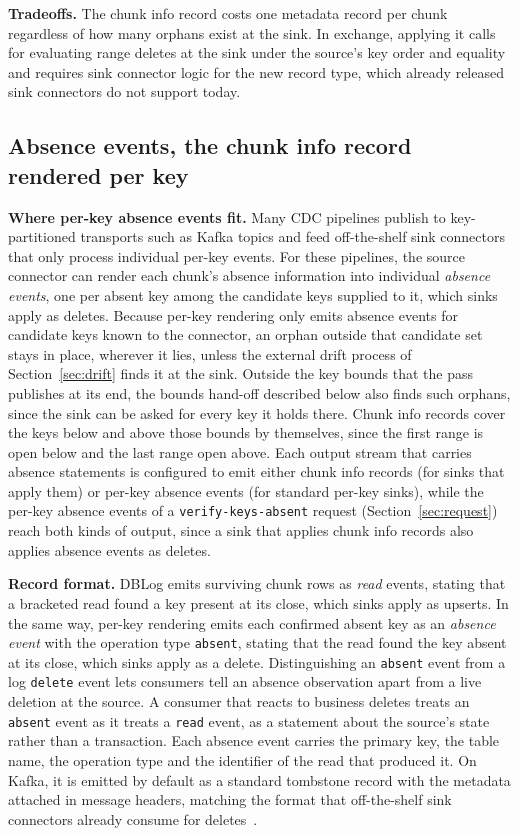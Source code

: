 \documentclass[sigconf,nonacm,10pt]{acmart}
\begin{document}
\textbf{Tradeoffs.} The chunk info record costs one metadata record per chunk
regardless of how many orphans exist at the sink. In exchange, applying it
calls for evaluating range deletes at the sink under the source's key order and
equality and requires sink connector logic for the new record type, which 
already released sink connectors do not support today.

\subsection{Absence events, the chunk info record rendered per key}\label{sec:absence}

\textbf{Where per-key absence events fit.} Many CDC pipelines publish to key-partitioned
transports such as Kafka topics and feed off-the-shelf sink connectors that only
process individual per-key events. For these pipelines, the source connector can
render each chunk's absence information into individual \emph{absence events},
one per absent key among the candidate keys supplied to it, which sinks apply
as deletes.
Because per-key rendering only emits absence events for candidate keys known to
the connector, an orphan outside that candidate set stays in place, wherever it
lies, unless the external drift process of Section~\ref{sec:drift} finds it at
the sink. Outside the key bounds that the pass publishes at its end, the bounds
hand-off described below also finds such orphans, since the sink can be asked
for every key it holds there. Chunk info records cover the keys below and above those bounds by themselves, since the first range is open below and the last range open
above. Each
output stream that carries absence statements is configured to emit either chunk info records (for sinks that apply them) or per-key absence events (for standard per-key
sinks), while the per-key absence events of a \texttt{verify-keys-absent}
request (Section~\ref{sec:request}) reach both kinds of output, since a sink
that applies chunk info records also applies absence events as deletes.

\textbf{Record format.} DBLog emits surviving chunk rows as \emph{read} events,
stating that a bracketed read found a key present at its close, which sinks
apply as upserts. In the same way, per-key rendering emits each confirmed
absent key as an \emph{absence event} with the operation type \texttt{absent},
stating that the read found the key absent at its close, which sinks apply as
a delete. Distinguishing an \texttt{absent} event from a log \texttt{delete}
event lets consumers tell an absence observation apart from a live deletion at
the source. A consumer that reacts to business deletes treats an
\texttt{absent} event as it treats a \texttt{read} event, as a statement about
the source's state rather than a transaction. Each absence event carries the
primary key, the table name, the operation type and the identifier of the read
that produced it. On Kafka, it is emitted by default as a standard tombstone
record with the metadata attached in message headers, matching the format that
off-the-shelf sink connectors already consume for deletes~\cite{kafka_docs}.
\end{document}
